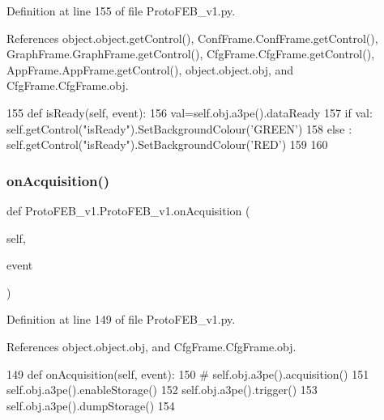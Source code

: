 Definition at line 155 of file Proto\+F\+E\+B\+\_\+v1.\+py.



References object.\+object.\+get\+Control(), Conf\+Frame.\+Conf\+Frame.\+get\+Control(), Graph\+Frame.\+Graph\+Frame.\+get\+Control(), Cfg\+Frame.\+Cfg\+Frame.\+get\+Control(), App\+Frame.\+App\+Frame.\+get\+Control(), object.\+object.\+obj, and Cfg\+Frame.\+Cfg\+Frame.\+obj.


\begin{DoxyCode}
155     \textcolor{keyword}{def }isReady(self, event):
156         val=self.obj.a3pe().dataReady
157         \textcolor{keywordflow}{if} val: self.getControl(\textcolor{stringliteral}{"isReady"}).SetBackgroundColour(\textcolor{stringliteral}{'GREEN'})
158         \textcolor{keywordflow}{else} : self.getControl(\textcolor{stringliteral}{"isReady"}).SetBackgroundColour(\textcolor{stringliteral}{'RED'})
159 
160 
\end{DoxyCode}
\mbox{\label{classProtoFEB__v1_1_1ProtoFEB__v1_a13917550359353e22ea8ee17d856d472}} 
\subsubsection{\texorpdfstring{on\+Acquisition()}{onAcquisition()}}
{\footnotesize\ttfamily def Proto\+F\+E\+B\+\_\+v1.\+Proto\+F\+E\+B\+\_\+v1.\+on\+Acquisition (\begin{DoxyParamCaption}\item[{}]{self,  }\item[{}]{event }\end{DoxyParamCaption})}



Definition at line 149 of file Proto\+F\+E\+B\+\_\+v1.\+py.



References object.\+object.\+obj, and Cfg\+Frame.\+Cfg\+Frame.\+obj.


\begin{DoxyCode}
149     \textcolor{keyword}{def }onAcquisition(self, event):
150 \textcolor{comment}{#        self.obj.a3pe().acquisition()}
151         self.obj.a3pe().enableStorage()
152         self.obj.a3pe().trigger()
153         self.obj.a3pe().dumpStorage()
154 
\end{DoxyCode}
\mbox{\label{classProtoFEB__v1_1_1ProtoFEB__v1_a11a6f30c362bd2261ab1ea60a04b36f4}} 

